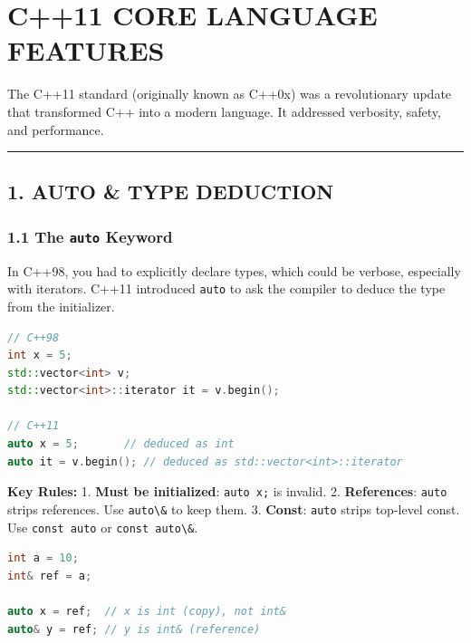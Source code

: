 \hypertarget{c11-core-language-features}{%
\chapter{C++11 CORE LANGUAGE
FEATURES}\label{c11-core-language-features}}

The C++11 standard (originally known as C++0x) was a revolutionary
update that transformed C++ into a modern language. It addressed
verbosity, safety, and performance.

\begin{center}\rule{0.5\linewidth}{0.5pt}\end{center}

\hypertarget{auto-type-deduction}{%
\section{1. AUTO \& TYPE DEDUCTION}\label{auto-type-deduction}}

\hypertarget{the-auto-keyword}{%
\subsection{\texorpdfstring{1.1 The \texttt{auto}
Keyword}{1.1 The auto Keyword}}\label{the-auto-keyword}}

In C++98, you had to explicitly declare types, which could be verbose,
especially with iterators. C++11 introduced
\passthrough{\lstinline!auto!} to ask the compiler to deduce the type
from the initializer.

\begin{lstlisting}[language={C++}]
// C++98
int x = 5;
std::vector<int> v;
std::vector<int>::iterator it = v.begin();

// C++11
auto x = 5;       // deduced as int
auto it = v.begin(); // deduced as std::vector<int>::iterator
\end{lstlisting}

\textbf{Key Rules:} 1. \textbf{Must be initialized}:
\passthrough{\lstinline!auto x;!} is invalid. 2. \textbf{References}:
\passthrough{\lstinline!auto!} strips references. Use
\passthrough{\lstinline!auto\&!} to keep them. 3. \textbf{Const}:
\passthrough{\lstinline!auto!} strips top-level const. Use
\passthrough{\lstinline!const auto!} or
\passthrough{\lstinline!const auto\&!}.

\begin{lstlisting}[language={C++}]
int a = 10;
int& ref = a;

auto x = ref;  // x is int (copy), not int&
auto& y = ref; // y is int& (reference)
\end{lstlisting}

